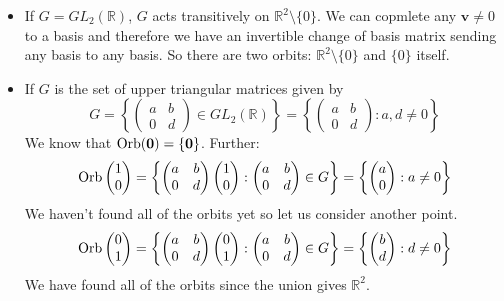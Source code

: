 \documentclass{article}
\begin{document}
\begin{itemize}
	\item If $G = GL_2(\mathbb R)$, $G$ acts transitively on $\mathbb R^2 \setminus \{ 0 \}$. We can copmlete any $\bm v \neq 0$ to a basis and therefore we have an invertible change of basis matrix sending any basis to any basis. So there are two orbits: $\mathbb R^2 \setminus \{ 0 \}$ and $\{ 0 \}$ itself.
	\item If $G$ is the set of upper triangular matrices given by
	      \[ G = \left\{ \begin{pmatrix}
			      a & b \\ 0 & d
		      \end{pmatrix} \in GL_2(\mathbb R) \right\} = \left\{ \begin{pmatrix}
			      a & b \\ 0 & d
		      \end{pmatrix}: a, d \neq 0 \right\} \]
	      We know that $\operatorname{Orb}(\bm 0) = \{ \bm 0 \}$. Further:
	      \[ \operatorname{Orb}\begin{pmatrix}
			      1 \\ 0
		      \end{pmatrix} = \left\{ \begin{pmatrix}
			      a & b \\ 0 & d
		      \end{pmatrix} \begin{pmatrix}
			      1 \\ 0
		      \end{pmatrix}: \begin{pmatrix}
			      a & b \\ 0 & d
		      \end{pmatrix} \in G \right\} = \left\{ \begin{pmatrix}
			      a \\ 0
		      \end{pmatrix}: a \neq 0 \right\} \]
	      We haven't found all of the orbits yet so let us consider another point.
	      \[ \operatorname{Orb}\begin{pmatrix}
			      0 \\ 1
		      \end{pmatrix} = \left\{ \begin{pmatrix}
			      a & b \\ 0 & d
		      \end{pmatrix} \begin{pmatrix}
			      0 \\ 1
		      \end{pmatrix}: \begin{pmatrix}
			      a & b \\ 0 & d
		      \end{pmatrix} \in G \right\} = \left\{ \begin{pmatrix}
			      b \\ d
		      \end{pmatrix}: d \neq 0 \right\} \]
	      We have found all of the orbits since the union gives $\mathbb R^2$.
\end{itemize}
\end{document}
